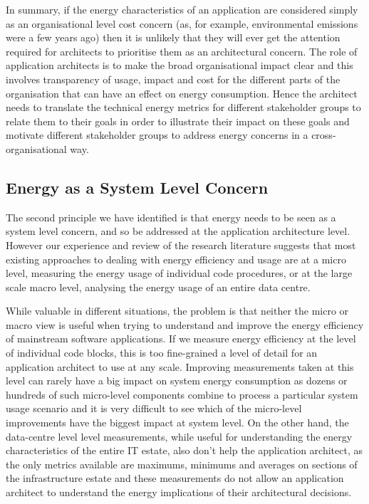 In summary, if the energy characteristics of an application are considered simply as an organisational level cost concern (as, for example, environmental emissions were a few years ago) then it is unlikely that they will ever get the attention required for architects to prioritise them as an architectural concern.  The role of application architects is to make the broad organisational impact clear and this involves transparency of usage, impact and cost for the different parts of the organisation that can have an effect on energy consumption.  Hence the architect needs to translate the technical energy metrics for different stakeholder groups to relate them to their goals in order to illustrate their impact on these goals and motivate different stakeholder groups to address energy concerns in a cross-organisational way. 

\subsection{Energy as a System Level Concern}

The second principle we have identified is that energy needs to be seen as a system level concern, and so be addressed at the application architecture level.  However our experience and review of the research literature suggests that most existing approaches to dealing with energy efficiency and usage are at a micro level, measuring the energy usage of individual code procedures, or at the large scale macro level, analysing the energy usage of an entire data centre.  

While valuable in different situations, the problem is that neither the micro or macro view is useful when trying to understand and improve the energy efficiency of mainstream software applications.  If we measure energy efficiency at the level of individual code blocks, this is too fine-grained a level of detail for an application architect to use at any scale.  Improving measurements taken at this level can rarely have a big impact on system energy consumption as dozens or hundreds of such micro-level components combine to process a particular system usage scenario and it is very difficult to see which of the micro-level improvements have the biggest impact at system level.  On the other hand, the data-centre level level measurements, while useful for understanding the energy characteristics of the entire IT estate, also don't help the application architect, as the only metrics available are maximums, minimums and averages on sections of the infrastructure estate and these measurements do not allow an application architect to understand the energy implications of their architectural decisions.

